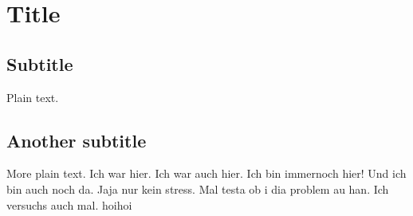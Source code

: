 \documentclass{article}
\begin{document}
\section{Title}

\subsection{Subtitle}

Plain text.

\subsection{Another subtitle}

More plain text.
Ich war hier.
Ich war auch hier.
Ich bin immernoch hier!
Und ich bin auch noch da.
Jaja nur kein stress.
Mal testa ob i dia problem au han.
Ich versuchs auch mal.
hoihoi
\end{document}
